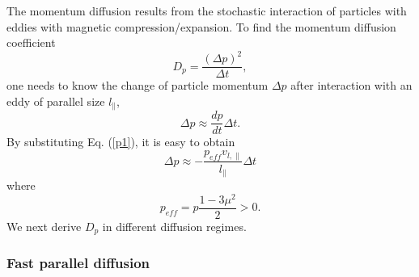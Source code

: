 \documentclass[preprint2,twocolumn,times,tighten]{aastex63}
\newcommand*{\xu}{\color{magenta}}
\begin{document}
{{The momentum diffusion results from the stochastic interaction of particles with eddies with magnetic compression/expansion.} To find the momentum diffusion coefficient
\begin{equation}
    D_p=\frac{(\Delta p)^2}{\Delta t},
    \label{D0}
\end{equation}
one needs to know the {change} of particle momentum $\Delta p$ {after interaction with an eddy of parallel size $l_\|$,}
\begin{equation}
    \Delta p\approx \frac{dp}{dt}\Delta t.
    \label{deltap}
\end{equation}
By substituting Eq. (\ref{p1}), it is easy to obtain
\begin{equation}
    \Delta p \approx - \frac{p_{eff} v_{l,\|}}{l_\|}\Delta t 
    \label{deltap1}
\end{equation}
where
\begin{equation}
    p_{eff}= p\frac{1-3\mu^2}{2} >0.
    \label{peff}
\end{equation}
We next derive $D_p$ in different diffusion regimes. 



\subsubsection{Fast parallel diffusion} 

}
\end{document}
